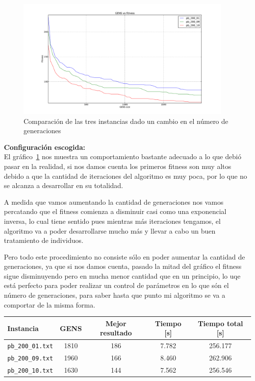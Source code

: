 \begin{figure}[h!]
\begin{center}
	\includegraphics[width=0.95\textwidth]{img/2.pdf}
	\caption{Comparaci\'on de las tres instancias dado un cambio en el n\'umero de generaciones}
	\label{fig:2}
\end{center}
\end{figure}

\textbf{Configuración escogida:}\\

El gráfico~\ref{fig:2} nos muestra un comportamiento bastante adecuado a lo que debió pasar
en la realidad, si nos damos cuenta los primeros fitness son muy altos debido a que la cantidad
de iteraciones del algoritmo es muy poca, por lo que no se alcanza a desarrollar en su totalidad.

A medida que vamos aumentando la cantidad de generaciones nos vamos percatando que el fitness
comienza a disminuir casi como una exponencial inversa, lo cual tiene sentido pues mientras
más iteraciones tengamos, el algoritmo va a poder desarrollarse mucho más y llevar a cabo
un buen tratamiento de individuos.

Pero todo este procedimiento no consiste sólo en poder aumentar la cantidad de generaciones,
ya que si nos damos cuenta, pasado la mitad del gráfico el fitness sigue disminuyendo pero
en mucha menor cantidad que en un principio, lo uqe está perfecto para poder realizar
un control de parámetros en lo que són el número de generaciones, para saber
hasta que punto mi algoritmo se va a comportar de la misma forma.


\begin{center}
\begin{tabular}{|l|c|c|c|c|}
	\hline
	\textbf{Instancia} & \textbf{GENS} &\textbf{Mejor resultado} & \textbf{Tiempo [s] } & \textbf{Tiempo total [s]}\\\hline
	\texttt{pb\_200\_01.txt} & 1810 & 186 & 7.782 & 256.177 \\\hline
	\texttt{pb\_200\_09.txt} & 1960 & 166 & 8.460 & 262.906 \\\hline
	\texttt{pb\_200\_10.txt} & 1630 & 144 & 7.562 & 256.546 \\\hline
\end{tabular}
\end{center}

